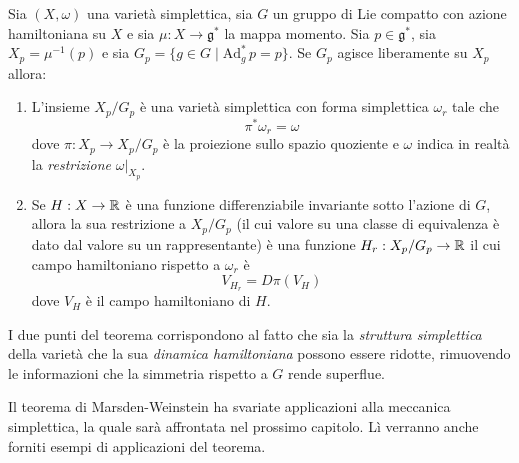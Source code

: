 \begin{theorem}
  Sia $(X,\omega)$ una varietà simplettica, sia $G$ un gruppo di Lie compatto con azione hamiltoniana su $X$ e sia $\mu:  X \to \mathfrak{g}^*$ la mappa momento. Sia $p \in \mathfrak{g}^*$, sia $X_p = \mu^{-1}(p)$ e sia $G_p = \{g \in G \mid \mathrm{Ad}_g^*\, p = p\}$. Se $G_p$ agisce liberamente su $X_p$ allora:
  \begin{enumerate}
    \item L'insieme $X_p/G_p$ è una varietà simplettica con forma simplettica $\omega_r$ tale che \begin{equation*}
    \pi^* \omega_r = \omega
    \end{equation*} 
    dove $\pi:X_p \to X_p/G_p$ è la proiezione sullo spazio quoziente e $\omega$ indica in realtà la \emph{restrizione} $\omega|_{X_p}$.
    \item Se $H:X\to \mathbb{R}$ è una funzione differenziabile invariante sotto l'azione di $G$, allora la sua restrizione a $X_p/G_p$ (il cui valore su una classe di equivalenza è dato dal valore su un rappresentante) è una funzione $H_r:X_p/G_p \to \mathbb{R}$ il cui campo hamiltoniano rispetto a $\omega_r$ è \begin{equation*}
    V_{H_r} = D \pi(V_H)
    \end{equation*}
    dove $V_H$ è il campo hamiltoniano di $H$.
  \end{enumerate}
\end{theorem}
\begin{remark}
  I due punti del teorema corrispondono al fatto che sia la \emph{struttura simplettica} della varietà che la sua \emph{dinamica hamiltoniana} possono essere ridotte, rimuovendo le informazioni che la simmetria rispetto a $G$ rende superflue.
\end{remark}

Il teorema di Marsden-Weinstein ha svariate applicazioni alla meccanica simplettica, la quale sarà affrontata nel prossimo capitolo. Lì verranno anche forniti esempi di applicazioni del teorema.